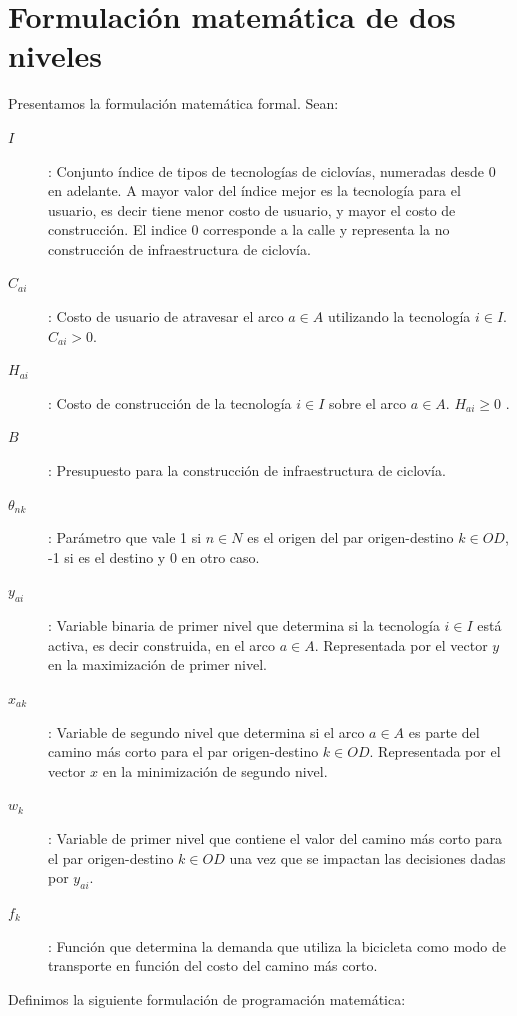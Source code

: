 \FloatBarrier
\section{Formulación matemática de dos niveles}

Presentamos la formulación matemática formal. Sean:

\begin{description}
  \item[$I$]: Conjunto índice de tipos de tecnologías de ciclovías, numeradas desde $0$ en adelante. A mayor valor del índice mejor es la tecnología para el usuario, es decir tiene menor costo de usuario, y mayor el costo de construcción. El indice 0 corresponde a la calle y representa la no construcción de infraestructura de ciclovía.
  \item[$C_{ai}$]: Costo de usuario de atravesar el arco $a \in A$ utilizando la tecnología $i \in I$. $C_{ai} > 0$.
  \item[$H_{ai}$]: Costo de construcción de la tecnología $i \in I$ sobre el arco $a \in A$. $H_{ai} \geq 0$ .
  \item[$B$]: Presupuesto para la construcción de infraestructura de ciclovía.
  \item[$\theta_{nk}$]: Parámetro que vale 1 si $n \in N$ es el origen del par origen-destino $k \in OD$, -1 si es el destino y 0 en otro caso.
  \item[$y_{ai}$]: Variable binaria de primer nivel que determina si la tecnología $i \in I$ está activa, es decir construida, en el arco $a \in A$. Representada por el vector $y$ en la maximización de primer nivel.
  \item[$x_{ak}$]: Variable de segundo nivel que determina si el arco $a \in A$ es parte del camino más corto para el par origen-destino $k \in OD$. Representada por el vector $x$ en la minimización de segundo nivel.
  \item[$w_k$]: Variable de primer nivel que contiene el valor del camino más corto para el par origen-destino $k \in OD$ una vez que se impactan las decisiones dadas por $y_{ai}$. \item[$f_k$]: Función que determina la demanda que utiliza la bicicleta como modo de transporte en función del costo del camino más corto. \end{description}

Definimos la siguiente formulación de programación matemática:

